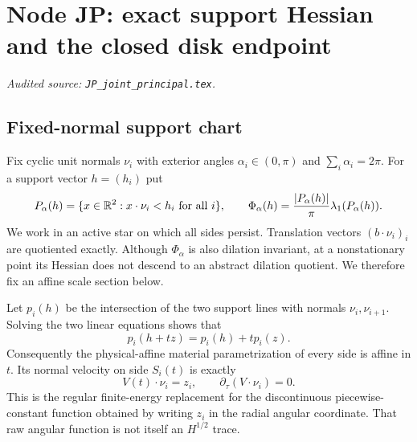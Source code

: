 \begingroup
\section{Node JP: exact support Hessian and the closed disk endpoint}
\label{module:JP}
\noindent\textit{Audited source: \nolinkurl{JP_joint_principal.tex}.}
\subsection{Fixed-normal support chart}

Fix cyclic unit normals $\nu_i$ with exterior angles
$\alpha_i\in(0,\pi)$ and $\sum_i\alpha_i=2\pi$.  For a support vector
$h=(h_i)$ put
\begin{equation}\label{JP:eq:P}
 P_\alpha(h)=\{x\in\mathbb R^2:x\cdot\nu_i<h_i\ \hbox{for all }i\},
 \qquad
 \Phi_\alpha(h)=\frac{|P_\alpha(h)|}{\pi}\lambda_1(P_\alpha(h)).
\end{equation}
We work in an active star on which all sides persist.  Translation vectors
$(b\cdot\nu_i)_i$ are quotiented exactly.  Although $\Phi_\alpha$ is also
dilation invariant, at a nonstationary point its Hessian does not descend
to an abstract dilation quotient.  We therefore fix an affine scale section
below.

Let $p_i(h)$ be the intersection of the two support lines with normals
$\nu_i,\nu_{i+1}$.  Solving the two linear equations shows that
\begin{equation}\label{JP:eq:vertex-linear}
 p_i(h+tz)=p_i(h)+t p_i(z).
\end{equation}
Consequently the physical-affine material parametrization of every side is
affine in $t$.  Its normal velocity on side $S_i(t)$ is exactly
\begin{equation}\label{JP:eq:constant-normal}
 V(t)\cdot\nu_i=z_i,\qquad \partial_\tau(V\cdot\nu_i)=0.
\end{equation}
This is the regular finite-energy replacement for the discontinuous
piecewise-constant function obtained by writing $z_i$ in the radial angular
coordinate.  That raw angular function is not itself an $H^{1/2}$ trace.

